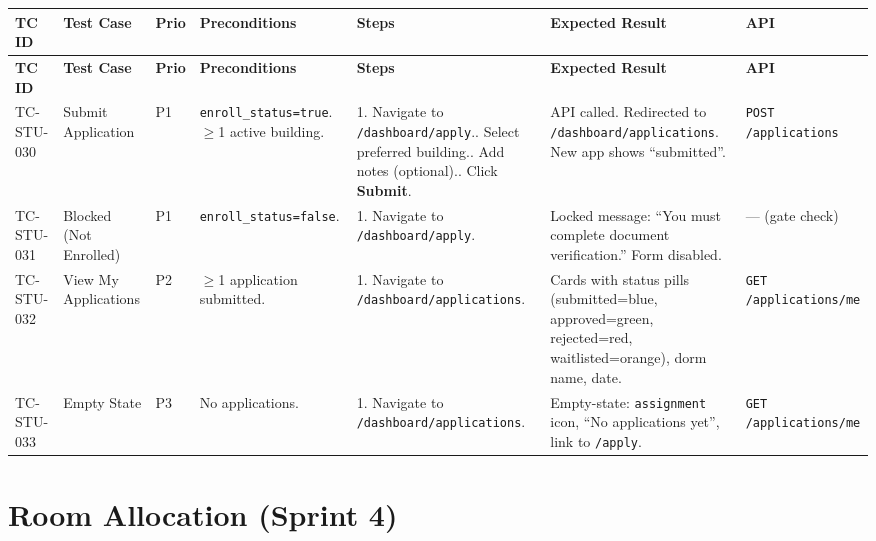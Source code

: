 \documentclass[12pt,a4paper]{article}
\begin{document}
\begin{longtable}{L{2cm} L{3cm} L{1cm} L{4cm} L{5.5cm} L{5.5cm} L{3cm}}
\toprule
\textbf{TC ID} & \textbf{Test Case} & \textbf{Prio} & \textbf{Preconditions} & \textbf{Steps} & \textbf{Expected Result} & \textbf{API} \\
\midrule
\endfirsthead
\toprule
\textbf{TC ID} & \textbf{Test Case} & \textbf{Prio} & \textbf{Preconditions} & \textbf{Steps} & \textbf{Expected Result} & \textbf{API} \\
\midrule
\endhead
\bottomrule
\endfoot

TC-STU-030
& Submit Application
& P1
& \texttt{enroll\_status=true}. $\geq$1 active building.
& 1. Navigate to \texttt{/dashboard/apply}.. Select preferred building.. Add notes (optional).. Click \textbf{Submit}.
& API called. Redirected to \texttt{/dashboard/applications}. New app shows ``submitted''.
& \texttt{POST /applications}
\\
\midrule

TC-STU-031
& Blocked (Not Enrolled)
& P1
& \texttt{enroll\_status=false}.
& 1. Navigate to \texttt{/dashboard/apply}.
& Locked message: ``You must complete document verification.'' Form disabled.
& --- (gate check)
\\
\midrule

TC-STU-032
& View My Applications
& P2
& $\geq$1 application submitted.
& 1. Navigate to \texttt{/dashboard/applications}.
& Cards with status pills (submitted=blue, approved=green, rejected=red, waitlisted=orange), dorm name, date.
& \texttt{GET /applications/me}
\\
\midrule

TC-STU-033
& Empty State
& P3
& No applications.
& 1. Navigate to \texttt{/dashboard/applications}.
& Empty-state: \texttt{assignment} icon, ``No applications yet'', link to \texttt{/apply}.
& \texttt{GET /applications/me}
\\

\end{longtable}


\section{Room Allocation (Sprint 4)}
\end{document}

